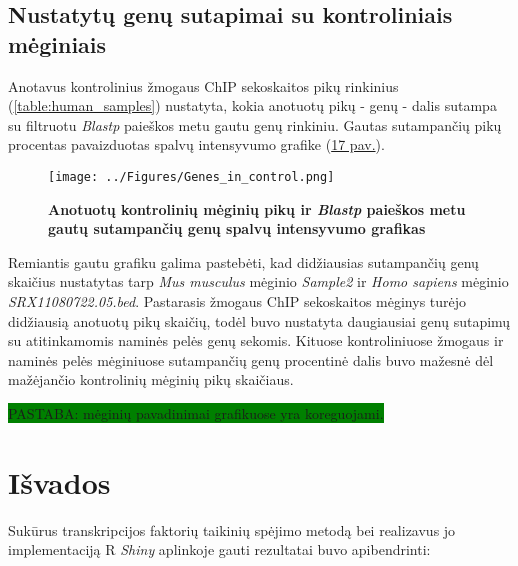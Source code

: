 \documentclass[12pt]{article}
\begin{document}
\newpage

\subsection*{Nustatytų genų sutapimai su kontroliniais mėginiais}
Anotavus kontrolinius žmogaus ChIP sekoskaitos pikų rinkinius
(\ref{table:human_samples}) nustatyta, kokia anotuotų pikų - genų - dalis
sutampa su filtruotu \emph{Blastp} paieškos metu gautu genų rinkiniu. Gautas
sutampančių pikų procentas pavaizduotas spalvų intensyvumo grafike
(\hyperref[fig:image17]{17 pav.}).

\begin{figure}[ht]
    \begin{center}
        \captionsetup{justification=centering}
        \texttt{[image: ../Figures/Genes\_in\_control.png]}
        \vspace{-1.5\baselineskip}
        \caption{\small\textbf{Anotuotų kontrolinių mėginių pikų ir
                                \emph{Blastp} paieškos metu gautų sutampančių
                                genų spalvų intensyvumo grafikas}}
        \label{fig:image17}
    \end{center}
\end{figure}

Remiantis gautu grafiku galima pastebėti, kad didžiausias sutampančių genų
skaičius nus\-ta\-ty\-tas tarp \emph{Mus musculus} mėginio \emph{Sample2} ir
\emph{Homo sapiens} mėginio \emph{SRX11080722.05.bed}. Pas\-ta\-ra\-sis žmogaus
ChIP sekoskaitos mėginys turėjo didžiausią anotuotų pikų skaičių, todėl 
buvo nustatyta daugiausiai genų sutapimų su atitinkamomis naminės pelės genų
sekomis. Kituose kontroliniuose žmogaus ir naminės pelės mėginiuose sutampančių
genų procentinė dalis buvo mažesnė dėl mažėjančio kontrolinių mėginių pikų
skaičiaus.

\colorbox{green}{PASTABA: mėginių pavadinimai grafikuose yra koreguojami.}


\section{Išvados}
Sukūrus transkripcijos faktorių taikinių spėjimo metodą bei realizavus jo
implementaciją R \emph{Shiny} aplinkoje gauti rezultatai buvo apibendrinti:
\end{document}
